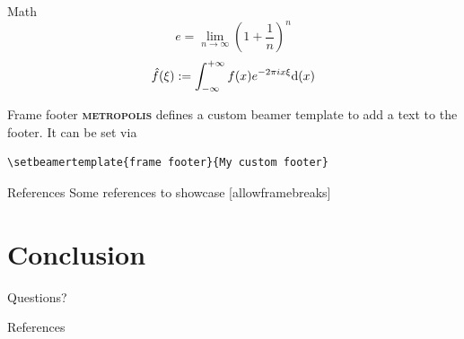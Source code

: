 \documentclass[8pt,UTF8]{ctexbeamer}
\newcommand{\themename}{\textbf{\textsc{metropolis}}\xspace}
\begin{document}
\begin{frame}{Math}
	\begin{equation}
    e = \lim_{n\to \infty} \left(1 + \frac{1}{n}\right)^n 
	\end{equation}
	\begin{equation}
    \hat{f}(\xi):=\int_{-\infty}^{+\infty}f(x)e^{-2\pi i x \xi}{\rm d}(x)
	\end{equation}
\end{frame}


{%
\begin{frame}[fragile]{Frame footer}
    \themename defines a custom beamer template to add a text to the footer. It can be set via
    \begin{verbatim}\setbeamertemplate{frame footer}{My custom footer}\end{verbatim}
\end{frame}
}

\begin{frame}{References}
  Some references to showcase [allowframebreaks] \cite{knuth92,ConcreteMath,Simpson,Er01,greenwade93}
\end{frame}

\section{Conclusion}

{
\begin{frame}[standout]
  Questions?
\end{frame}
}

\appendix

\begin{frame}[allowframebreaks]{References}

  
  

\end{frame}
\end{document}
